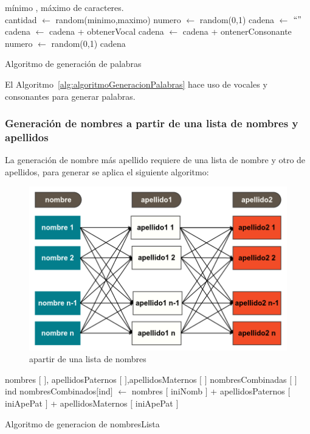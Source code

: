 \begin{algorithm}[H]
\begin{algorithmic}[1]
\REQUIRE m\'inimo , m\'aximo de caracteres.\\
\STATE cantidad $\leftarrow$ random(minimo,maximo)
\STATE numero $\leftarrow$ random(0,1)
\STATE cadena $\leftarrow$ $`` "$
\STATE cadena $\leftarrow$ cadena + obtenerVocal
\ELSE
\STATE cadena $\leftarrow$ cadena + ontenerConsonante
\ENDIF
\STATE numero $\leftarrow$ random(0,1)
\ENDWHILE
\RETURN cadena
\end{algorithmic}
\caption{Algoritmo de generaci\'on de palabras}\label{alg:algoritmoGeneracionPalabras}
\end{algorithm}
El Algoritmo~\ref{alg:algoritmoGeneracionPalabras} hace uso de vocales y consonantes para generar palabras.

\subsubsection{Generaci\'on de nombres a partir de una lista de nombres y apellidos}
La generaci\'on de nombre m\'as apellido requiere de una lista de nombre y otro de apellidos, para generar se aplica el siguiente algoritmo:
\begin{figure}[H]
\centering
\includegraphics[scale=0.4]{images/listNameApe1Ape2.png}
\caption{apartir de una lista de nombres}
\end{figure}
\begin{algorithm}[H]
\begin{algorithmic}[1]
\REQUIRE nombres $[$ $]$, apellidosPaternos $[$ $]$,apellidosMaternos $[$ $]$ \label{lin:NombresApellido1Apellido2}
\STATE nombresCombinadas $[$ $]$
\STATE ind
\STATE nombresCombinados$[$ind$]$ $\leftarrow$ nombres $[$ iniNomb $]$ + apellidosPaternos $[$ iniApePat $]$ + apellidosMaternos $[$ iniApePat $]$
\ENDFOR
\ENDFOR 
\ENDFOR
\RETURN \TRUE
\end{algorithmic}
\caption{Algoritmo de generacion de nombresLista}\label{alg:algoritmoRaro}
\end{algorithm}
